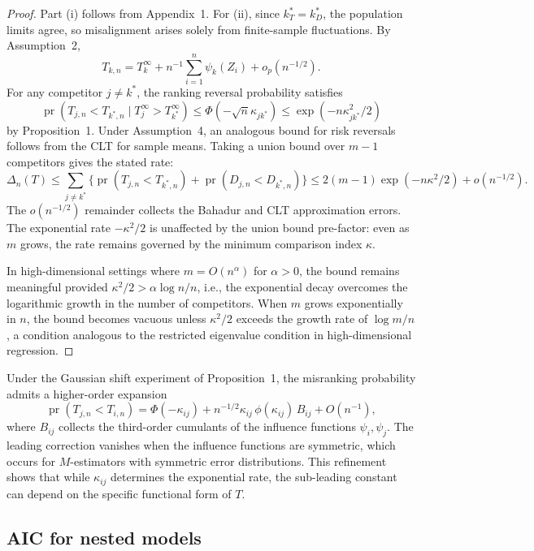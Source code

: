 \documentclass[lineno]{biometrika}
\DeclareMathOperator{\pr}{pr}
\begin{document}
\begin{proof}
Part (i) follows from Appendix~1. For (ii), since $k_T^* = k_D^*$, the population limits agree, so misalignment arises solely from finite-sample fluctuations. By Assumption~2,
\[
T_{k,n} = T_k^\infty + n^{-1}\textstyle\sum_{i=1}^n \psi_k(Z_i) + o_p(n^{-1/2}).
\]
For any competitor $j \neq k^*$, the ranking reversal probability satisfies
\[
\pr(T_{j,n} < T_{k^*,n} \mid T_j^\infty > T_{k^*}^\infty) \leq \Phi(-\sqrt{n}\kappa_{jk^*}) \leq \exp(-n\kappa_{jk^*}^2/2)
\]
by Proposition~1. Under Assumption~4, an analogous bound for risk reversals follows from the CLT for sample means. Taking a union bound over $m-1$ competitors gives the stated rate:
\[
\Delta_n(T) \leq \sum_{j\neq k^*} \bigl\{\pr(T_{j,n} < T_{k^*,n}) + \pr(D_{j,n} < D_{k^*,n})\bigr\}
\leq 2(m-1)\exp(-n\kappa^2/2) + o(n^{-1/2}).
\]
The $o(n^{-1/2})$ remainder collects the Bahadur and CLT approximation errors. The exponential rate $-\kappa^2/2$ is unaffected by the union bound pre-factor: even as $m$ grows, the rate remains governed by the minimum comparison index $\kappa$.

In high-dimensional settings where $m = O(n^\alpha)$ for $\alpha>0$, the bound remains meaningful provided $\kappa^2/2 > \alpha\log n / n$, i.e., the exponential decay overcomes the logarithmic growth in the number of competitors. When $m$ grows exponentially in $n$, the bound becomes vacuous unless $\kappa^2/2$ exceeds the growth rate of $\log m/n$, a condition analogous to the restricted eigenvalue condition in high-dimensional regression.
\end{proof}

\begin{remark}\label{rem:second}
Under the Gaussian shift experiment of Proposition~1, the misranking probability admits a higher-order expansion
\[
\pr(T_{j,n} < T_{i,n}) = \Phi(-\kappa_{ij}) + n^{-1/2}\kappa_{ij}\,\phi(\kappa_{ij})\,B_{ij} + O(n^{-1}),
\]
where $B_{ij}$ collects the third-order cumulants of the influence functions $\psi_i,\psi_j$. The leading correction vanishes when the influence functions are symmetric, which occurs for $M$-estimators with symmetric error distributions. This refinement shows that while $\kappa_{ij}$ determines the exponential rate, the sub-leading constant can depend on the specific functional form of $T$.
\end{remark}

\subsection{AIC for nested models}
\end{document}
